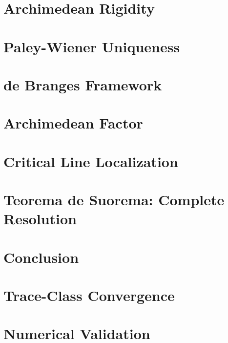 \documentclass[12pt]{article}
\begin{document}
\section{Archimedean Rigidity}


\section{Paley-Wiener Uniqueness}


\section{de Branges Framework}


\section{Archimedean Factor}


\section{Critical Line Localization}


\section{Teorema de Suorema: Complete Resolution}


\section{Conclusion}


\appendix

\section{Trace-Class Convergence}


\section{Numerical Validation}

\end{document}
